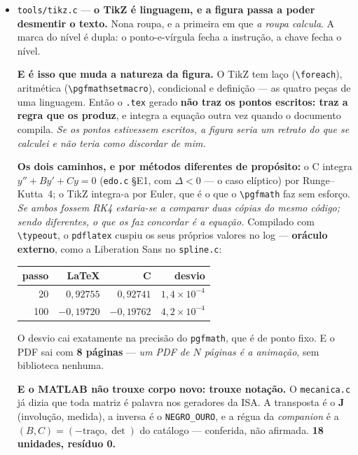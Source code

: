 \documentclass[11pt]{article}
\newcommand{\code}[1]{\texttt{\small #1}}
\theoremstyle{plain}
\theoremstyle{remark}
\begin{document}
\begin{itemize}
\item \code{tools/tikz.c} --- \textbf{o TikZ é linguagem, e a figura passa a poder desmentir o
texto.} Nona roupa, e a primeira em que \emph{a roupa calcula}. A marca do nível é dupla: o
ponto-e-vírgula fecha a instrução, a chave fecha o nível.

\textbf{E é isso que muda a natureza da figura.} O TikZ tem laço (\code{\textbackslash foreach}),
aritmética (\code{\textbackslash pgfmathsetmacro}), condicional e definição --- as quatro peças de
uma linguagem. Então o \code{.tex} gerado \textbf{não traz os pontos escritos: traz a regra que os
produz}, e integra a equação outra vez quando o documento compila. \emph{Se os pontos estivessem
escritos, a figura seria um retrato do que se calculei e não teria como discordar de mim.}

\textbf{Os dois caminhos, e por métodos diferentes de propósito:} o C integra
$y''+By'+Cy=0$ (\code{edo.c} §E1, com $\Delta<0$ --- o caso elíptico) por Runge--Kutta~4; o TikZ
integra-a por Euler, que é o que o \code{\textbackslash pgfmath} faz sem esforço. \emph{Se ambos
fossem RK4 estaria-se a comparar duas cópias do mesmo código; sendo diferentes, o que os faz
concordar é a equação.} Compilado com \code{\textbackslash typeout}, o \code{pdflatex} cuspiu os
seus próprios valores no log --- \textbf{oráculo externo}, como a Liberation Sans no
\code{spline.c}:

\begin{center}
\begin{tabular}{rrrr}
\toprule
passo & LaTeX & C & desvio \\
\midrule
 20 & $0{,}92755$ & $0{,}92741$ & $1{,}4\times10^{-4}$ \\
100 & $-0{,}19720$ & $-0{,}19762$ & $4{,}2\times10^{-4}$ \\
\bottomrule
\end{tabular}
\end{center}

O desvio cai exatamente na precisão do \code{pgfmath}, que é de ponto fixo. E o PDF sai com
\textbf{8 páginas} --- \emph{um PDF de $N$ páginas é a animação}, sem biblioteca nenhuma.

\textbf{E o MATLAB não trouxe corpo novo: trouxe notação.} O \code{mecanica.c} já dizia que toda
matriz é palavra nos geradores da ISA. A transposta é o \textbf{J} (involução, medida), a inversa é
o \code{NEGRO\_OURO}, e a régua da \emph{companion} é a $(B,C)=(-\text{traço},\det)$ do catálogo ---
conferida, não afirmada. \textbf{18 unidades, resíduo 0.}



\end{itemize}
\end{document}
